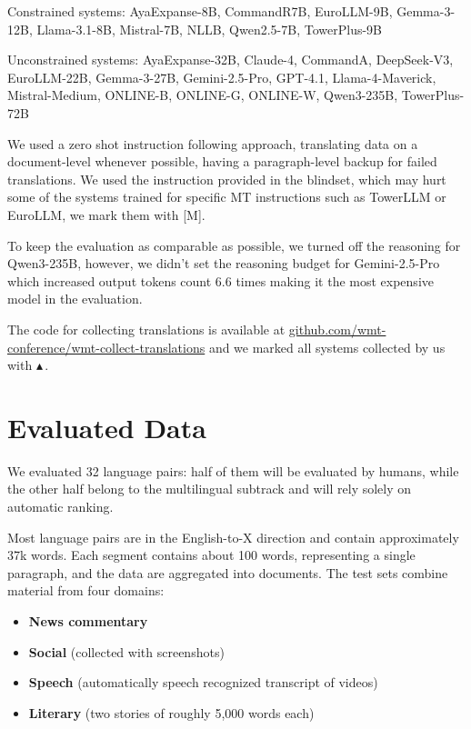 \documentclass[11pt]{article}
\newcommand{\official}{\(\blacktriangle\)\,}
\begin{document}
Constrained systems: 
AyaExpanse-8B, CommandR7B, EuroLLM-9B, Gemma-3-12B, Llama-3.1-8B, Mistral-7B, NLLB, Qwen2.5-7B, TowerPlus-9B

Unconstrained systems: AyaExpanse-32B, Claude-4, CommandA, DeepSeek-V3, EuroLLM-22B, Gemma-3-27B, Gemini-2.5-Pro, GPT-4.1, Llama-4-Maverick, Mistral-Medium, ONLINE-B, ONLINE-G, ONLINE-W, Qwen3-235B, TowerPlus-72B

We used a zero shot instruction following approach, translating data on a document-level whenever possible, having a paragraph-level backup for failed translations. We used the instruction provided in the blindset, which may hurt some of the systems trained for specific MT instructions such as TowerLLM or EuroLLM, we mark them with [M].

To keep the evaluation as comparable as possible, we turned off the reasoning for Qwen3-235B, however, we didn't set the reasoning budget for Gemini-2.5-Pro which increased output tokens count 6.6 times making it the most expensive model in the evaluation.

The code for collecting translations is available at \href{https://github.com/wmt-conference/wmt-collect-translations}{github.com/wmt-conference/wmt-collect-translations} and we marked all systems collected by us with \official{}.

\section*{Evaluated Data}

We evaluated 32 language pairs: half of them will be evaluated by humans, while the other half belong to the multilingual subtrack and will rely solely on automatic ranking.

Most language pairs are in the English-to-X direction and contain approximately 37k words. Each segment contains about 100 words, representing a single paragraph, and the data are aggregated into documents. The test sets combine material from four domains:
\begin{itemize}
    \item \textbf{News commentary}
    \item \textbf{Social} (collected with screenshots)
    \item \textbf{Speech} (automatically speech recognized transcript of videos)
    \item \textbf{Literary} (two stories of roughly 5{,}000 words each)
\end{itemize}
\end{document}
